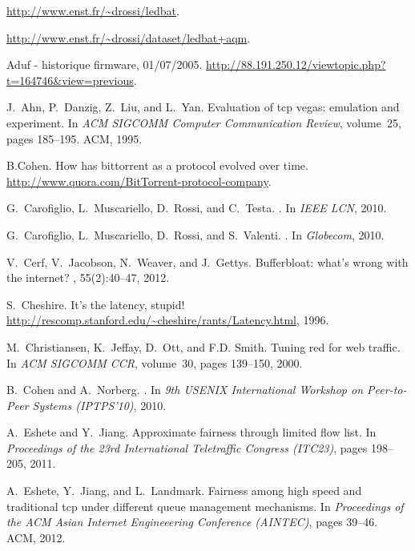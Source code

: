 \documentclass[conference]{IEEEtran}
\begin{document}

\begin{thebibliography}{10}

\url{http://www.enst.fr/~drossi/ledbat}.

\url{http://www.enst.fr/~drossi/dataset/ledbat+aqm}.

Aduf - historique firmware, 01/07/2005.
\newblock \url{http://88.191.250.12/viewtopic.php?t=164746&view=previous}.

J.~Ahn, P.~Danzig, Z.~Liu, and L.~Yan.
\newblock Evaluation of tcp vegas: emulation and experiment.
\newblock In {\em ACM SIGCOMM Computer Communication Review}, volume~25, pages
  185--195. ACM, 1995.

B.Cohen.
\newblock How has bittorrent as a protocol evolved over time.
\newblock \url{http://www.quora.com/BitTorrent-protocol-company}.

G.~Carofiglio, L.~Muscariello, D.~Rossi, and C.~Testa.
.
\newblock In {\em IEEE LCN}, 2010.

G.~Carofiglio, L.~Muscariello, D.~Rossi, and S.~Valenti.
.
\newblock In {\em Globecom}, 2010.

V.~Cerf, V.~Jacobson, N.~Weaver, and J.~Gettys.
\newblock Bufferbloat: what's wrong with the internet?
, 55(2):40--47, 2012.

S.~Cheshire.
\newblock It's the latency, stupid!
\newblock \url{http://rescomp.stanford.edu/~cheshire/rants/Latency.html}, 1996.

M.~Christiansen, K.~Jeffay, D.~Ott, and F.D. Smith.
\newblock Tuning red for web traffic.
\newblock In {\em ACM SIGCOMM CCR}, volume~30, pages 139--150, 2000.

B.~Cohen and A.~Norberg.
.
\newblock In {\em {9th USENIX International Workshop on Peer-to-Peer Systems
  (IPTPS'10)}}, 2010.

A.~Eshete and Y.~Jiang.
\newblock Approximate fairness through limited flow list.
\newblock In {\em Proceedings of the 23rd International Teletraffic Congress
  (ITC23)}, pages 198--205, 2011.

A.~Eshete, Y.~Jiang, and L.~Landmark.
\newblock Fairness among high speed and traditional tcp under different queue
  management mechanisms.
\newblock In {\em Proceedings of the ACM Asian Internet Engineeering Conference
  (AINTEC)}, pages 39--46. ACM, 2012.


\end{thebibliography}
\end{document}

